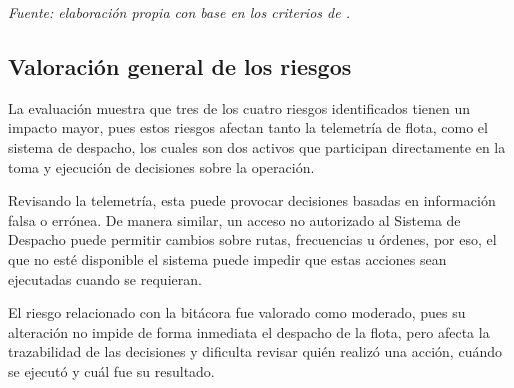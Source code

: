 \begin{flushleft}
	\footnotesize
	\textit{Fuente: elaboración propia con base en los criterios de \parencite{funcionpublica2025}.}
\end{flushleft}

\subsection{Valoración general de los riesgos}

La evaluación muestra que tres de los cuatro riesgos identificados tienen un impacto mayor, pues estos riesgos afectan tanto la telemetría de flota, como el sistema de despacho, los cuales son dos activos que participan directamente en la toma y ejecución de decisiones sobre la operación.

Revisando la telemetría, esta puede provocar decisiones basadas en información falsa o errónea. De manera similar, un acceso no autorizado al Sistema de Despacho puede permitir cambios sobre rutas, frecuencias u órdenes, por eso, el que no esté disponible el sistema puede impedir que estas acciones sean ejecutadas cuando se requieran.

El riesgo relacionado con la bitácora fue valorado como moderado, pues su alteración no impide de forma inmediata el despacho de la flota, pero afecta la trazabilidad de las decisiones y dificulta revisar quién realizó una acción, cuándo se ejecutó y cuál fue su resultado.

